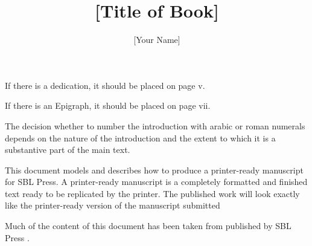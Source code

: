\documentclass[sblidx={ancient sources, modern authors, subject}]{sblbook}
\begin{document}
\frontmatter

\title{[Title of Book]}
\author{[Your Name]}
%
\maketitle

\begin{seriespage}
\end{seriespage}

\begin{titlepage}
\end{titlepage}

\begin{copyrightpage}
\end{copyrightpage}

\begin{dedication}
  If there is a dedication, it should be placed on page v.
\end{dedication}

\begin{epigraph}
  If there is an Epigraph, it should be placed on page vii.
\end{epigraph}

\tableofcontents

\listoffigures

\listoftables

\begin{foreword}
\end{foreword}

\begin{preface}
\end{preface}

\begin{acknowledgements}
\end{acknowledgements}

\begin{introduction}
  The decision whether to number the introduction with arabic or roman
  numerals depends on the nature of the introduction and the extent to which
  it is a substantive part of the main text.

  This document models and describes how to produce a printer-ready manuscript
  for SBL Press. A printer-ready manuscript is a completely formatted and
  finished text ready to be replicated by the printer. The published work will
  look exactly like the printer-ready version of the manuscript submitted

  Much of the content of this document has been taken from
   published by SBL Press \autocite{prmmanual}.
\end{introduction}
\end{document}
